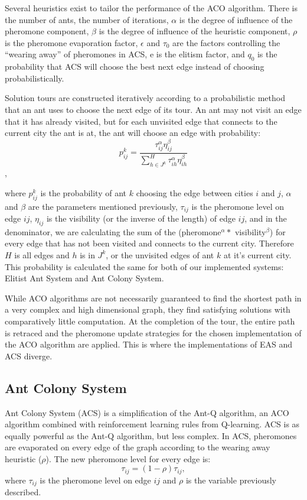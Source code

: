 \documentclass[11pt,twocolumn]{article}
\begin{document}
Several heuristics exist to tailor the performance of the ACO algorithm. There is the number of ants, the number of iterations, $\alpha$ is the degree of influence of the pheromone component, $\beta$ is the degree of influence of the heuristic component, $\rho$ is the pheromone evaporation factor, $\epsilon$ and $\tau_0$ are the factors controlling the “wearing away” of pheromones in ACS, e is the elitism factor, and $q_0$ is the probability that ACS will choose the best next edge instead of choosing probabilistically. 

Solution tours are constructed iteratively according to a probabilistic method that an ant uses to choose the next edge of its tour. An ant may not visit an edge that it has already visited, but for each unvisited edge that connects to the current city the ant is at, the ant will choose an edge with probability:\\
$$p_{ij}^{k}=\frac{\tau_{ij}^{\alpha} \eta_{ij}^{\beta}}{\sum_{h \in J^k}^H \tau_{ih}^{\alpha} \eta_{ih}^{\beta}}$$,

where $p_{ij}^{k}$ is the probability of ant $k$ choosing the edge between cities $i$ and $j$, $\alpha$ and $\beta$ are the parameters mentioned previously, $\tau_{ij}$ is the pheromone level on edge $ij$, $\eta_{ij}$ is the visibility (or the inverse of the length) of edge $ij$, and in the denominator, we are calculating the sum of the (pheromone$^{\alpha} *$ visibility$^\beta$) for every edge that has not been visited and connects to the current city. Therefore $H$ is all edges and $h$ is in $J^k$, or the unvisited edges of ant $k$ at it's current city. This probability is calculated the same for both of our implemented systems: Elitist Ant System and Ant Colony System.

While ACO algorithms are not necessarily guaranteed to find the shortest path in a very complex and high dimensional graph, they find satisfying solutions with comparatively little computation. At the completion of the tour, the entire path is retraced and the pheromone update strategies for the chosen implementation of the ACO algorithm are applied. This is where the implementations of EAS and ACS diverge.

\subsection{Ant Colony System}
Ant Colony System (ACS) is a simplification of the Ant-Q algorithm, an ACO algorithm combined with reinforcement learning rules from Q-learning. ACS is as equally powerful as the Ant-Q algorithm, but less complex. 
In ACS, pheromones are evaporated on every edge of the graph according to the wearing away heuristic ($\rho$). The new pheromone level for every edge is:
$$\tau_{ij} = (1- \rho)\tau_{ij},$$
where $\tau_{ij}$ is the pheromone level on edge $ij$ and $\rho$ is the variable previously described.
\end{document}
